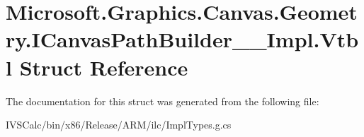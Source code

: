 \hypertarget{struct_microsoft_1_1_graphics_1_1_canvas_1_1_geometry_1_1_i_canvas_path_builder_____impl_1_1_vtbl}{}\section{Microsoft.\+Graphics.\+Canvas.\+Geometry.\+I\+Canvas\+Path\+Builder\+\_\+\+\_\+\+Impl.\+Vtbl Struct Reference}
\label{struct_microsoft_1_1_graphics_1_1_canvas_1_1_geometry_1_1_i_canvas_path_builder_____impl_1_1_vtbl}


The documentation for this struct was generated from the following file\+:\begin{DoxyCompactItemize}
\item 
I\+V\+S\+Calc/bin/x86/\+Release/\+A\+R\+M/ilc/Impl\+Types.\+g.\+cs\end{DoxyCompactItemize}
